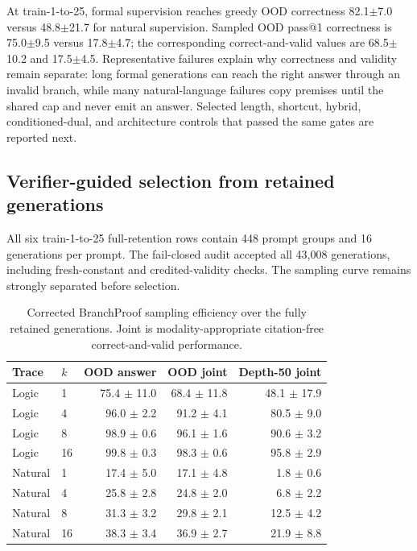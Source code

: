 \documentclass[10pt]{article}
\begin{document}
At train-1-to-25, formal supervision reaches greedy OOD correctness
82.1$\pm$7.0
versus 48.8$\pm$21.7
for natural supervision. Sampled OOD pass@1 correctness is
75.0$\pm$9.5 versus
17.8$\pm$4.7; the corresponding
correct-and-valid values are 68.5$\pm$10.2
and 17.5$\pm$4.5.
Representative failures explain why correctness and validity remain separate: long formal
generations can reach the right answer through an invalid branch, while many natural-language
failures copy premises until the shared cap and never emit an answer. Selected length, shortcut,
hybrid, conditioned-dual, and architecture controls that passed the same gates are reported next.


\subsection{Verifier-guided selection from retained generations}
All six train-1-to-25 full-retention rows contain 448 prompt groups and 16 generations per
prompt. The fail-closed audit accepted all 43,008 generations, including fresh-constant and
credited-validity checks. The sampling curve remains strongly separated before selection.

\begin{table}[H]
\centering
\scriptsize
\begin{tabular}{llrrr}
\toprule
Trace & $k$ & OOD answer & OOD joint & Depth-50 joint \\
\midrule
Logic & 1 & 75.4 $\pm$ 11.0 & 68.4 $\pm$ 11.8 & 48.1 $\pm$ 17.9 \\
Logic & 4 & 96.0 $\pm$ 2.2 & 91.2 $\pm$ 4.1 & 80.5 $\pm$ 9.0 \\
Logic & 8 & 98.9 $\pm$ 0.6 & 96.1 $\pm$ 1.6 & 90.6 $\pm$ 3.2 \\
Logic & 16 & 99.8 $\pm$ 0.3 & 98.3 $\pm$ 0.6 & 95.8 $\pm$ 2.9 \\
Natural & 1 & 17.4 $\pm$ 5.0 & 17.1 $\pm$ 4.8 & 1.8 $\pm$ 0.6 \\
Natural & 4 & 25.8 $\pm$ 2.8 & 24.8 $\pm$ 2.0 & 6.8 $\pm$ 2.2 \\
Natural & 8 & 31.3 $\pm$ 3.2 & 29.8 $\pm$ 2.1 & 12.5 $\pm$ 4.2 \\
Natural & 16 & 38.3 $\pm$ 3.4 & 36.9 $\pm$ 2.7 & 21.9 $\pm$ 8.8 \\
\bottomrule
\end{tabular}
\caption{Corrected BranchProof sampling efficiency over the fully retained generations.
Joint is modality-appropriate citation-free correct-and-valid performance.}
\end{table}
\end{document}
